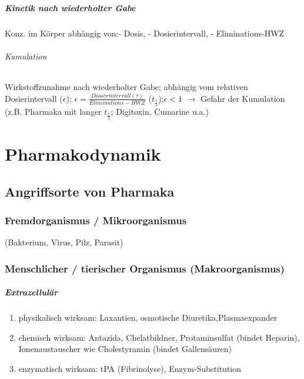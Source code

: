 \documentclass[10pt,a4paper]{report}
\begin{document}
\paragraph{Kinetik nach wiederholter Gabe}
Konz. im Körper abhängig von:- Dosis, - Dosierintervall, - Eliminations-HWZ \\
\subparagraph{Kumulation}  Wirkstoffzunahme nach wiederholter Gabe; abhängig vom relativen Dosierintervall ($\epsilon$); $\epsilon=\frac{Dosierintervall(\tau)}{Eliminations-HWZ}$ ($t_{\frac{1}{2}}$);$\epsilon <1$ $\rightarrow$  Gefahr der Kumulation (z.B. Pharmaka mit langer $t_{\frac{1}{2}}$; Digitoxin, Cumarine u.a.) 


\chapter{Pharmakodynamik}
\section{Angriffsorte von Pharmaka}
\subsection{Fremdorganismus / Mikroorganismus}
(Bakterium, Virus, Pilz, Parasit)
\subsection{Menschlicher / tierischer Organismus (Makroorganismus)}
\paragraph{Extrazellulär}
\begin{enumerate}
	\item physikalisch wirksam: Laxantien, osmotische 	Diuretika,Plasmaexpander
	\item chemisch wirksam: Antazida, Chelatbildner, Protaminsulfat (bindet Heparin), Ionenaustauscher wie Cholestyramin (bindet Gallensäuren)
	\item enzymatisch wirksam: tPA (Fibrinolyse), Enzym-Substitution
\end{enumerate}
\end{document}
